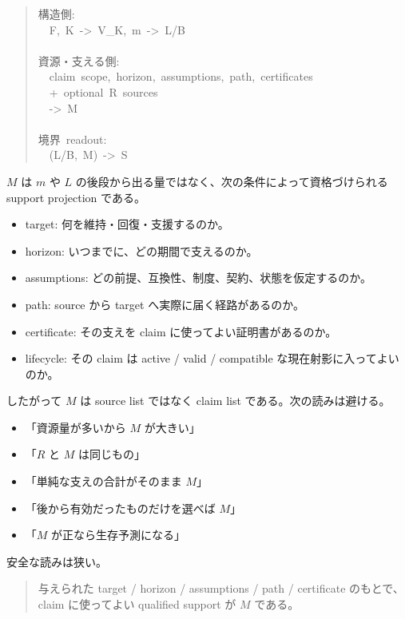 \documentclass[12pt,a4paper]{article}
\begin{document}
\begin{quote}
{\small\ttfamily\noindent
構造側: \\~~F,~K~->~V\_K,~m~->~L/B \\~ \\資源・支える側: \\~~claim~scope,~horizon,~assumptions,~path,~certificates \\~~+~optional~R~sources \\~~->~M \\~ \\境界~readout: \\~~(L/B,~M)~->~S
}
\end{quote}

\(M\) は \(m\) や \(L\) の後段から出る量ではなく、次の条件によって資格づけられる support projection である。

\begin{itemize}
\tightlist
\item
  target: 何を維持・回復・支援するのか。
\item
  horizon: いつまでに、どの期間で支えるのか。
\item
  assumptions: どの前提、互換性、制度、契約、状態を仮定するのか。
\item
  path: source から target へ実際に届く経路があるのか。
\item
  certificate: その支えを claim に使ってよい証明書があるのか。
\item
  lifecycle: その claim は active / valid / compatible な現在射影に入ってよいのか。
\end{itemize}

したがって \(M\) は source list ではなく claim list である。次の読みは避ける。

\begin{itemize}
\tightlist
\item
  「資源量が多いから \(M\) が大きい」
\item
  「\(R\) と \(M\) は同じもの」
\item
  「単純な支えの合計がそのまま \(M\)」
\item
  「後から有効だったものだけを選べば \(M\)」
\item
  「\(M\) が正なら生存予測になる」
\end{itemize}

安全な読みは狭い。

\begin{quote}
与えられた target / horizon / assumptions / path / certificate のもとで、 claim に使ってよい qualified support が \(M\) である。
\end{quote}
\end{document}
